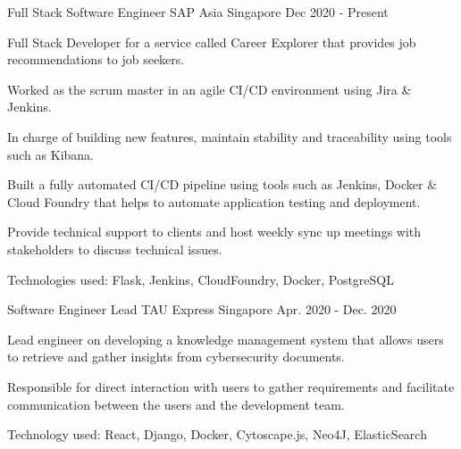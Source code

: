 

\begin{cventries}

  \cventry
    {Full Stack Software Engineer} %
    {SAP Asia} %
    {Singapore} %
    {Dec 2020 - Present} %
    {
      \begin{cvitems} %
        \item {Full Stack Developer for a service called Career Explorer that provides job recommendations to job seekers.}
        \item {Worked as the scrum master in an agile CI/CD environment using Jira \& Jenkins.}
        \item {In charge of building new features, maintain stability and traceability using tools such as Kibana.}
        \item {Built a fully automated CI/CD pipeline using tools such as Jenkins, Docker \& Cloud Foundry that helps to automate application testing and deployment.}
        \item {Provide technical support to clients and host weekly sync up meetings with stakeholders to discuss technical issues.}
        \item {Technologies used: Flask, Jenkins, CloudFoundry, Docker, PostgreSQL}
      \end{cvitems}
    }

  \cventry
    {Software Engineer Lead} %
    {TAU Express} %
    {Singapore} %
    {Apr. 2020 - Dec. 2020} %
    {
      \begin{cvitems} %
        \item {Lead engineer on developing a knowledge management system that allows users to retrieve and gather insights from cybersecurity documents.}
        \item {Responsible for direct interaction with users to gather requirements and facilitate communication between the users and the development team.}
        \item {Technology used: React, Django, Docker, Cytoscape.js, Neo4J, ElasticSearch}
     \end{cvitems}
    }


\end{cventries}

